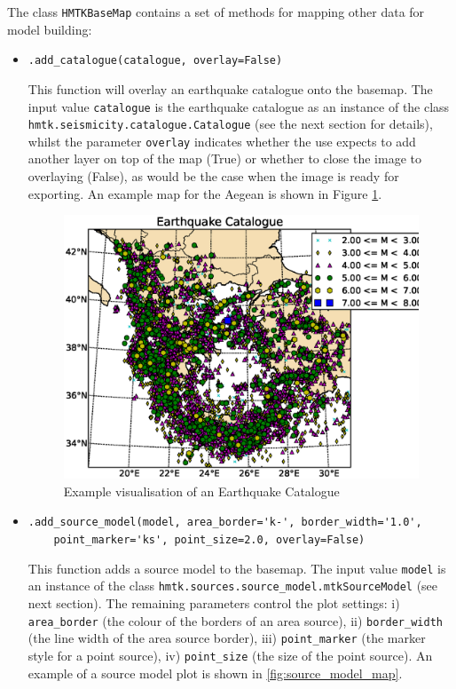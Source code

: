 The class \verb=HMTKBaseMap= contains a set of methods for mapping other data for model building:
\begin{itemize}
\item \verb;.add_catalogue(catalogue, overlay=False);

This function will overlay an earthquake catalogue onto the basemap. The input value \verb=catalogue= is the earthquake catalogue as an instance of the class \\\verb=hmtk.seismicity.catalogue.Catalogue= (see the next section for details), whilst the parameter \verb=overlay= indicates whether the use expects to add another layer on top of the map (True) or whether to close the image to overlaying (False), as would be the case when the image is ready for exporting. An example map for the Aegean is shown in Figure \ref{fig:eqcat_simple}.
   
\begin{figure}[htb]
  \centering
      \includegraphics[trim=20mm 14mm 1mm 1mm, clip, width=\textwidth]{./figures/EQCatalogueSimple.eps}
  \caption{Example visualisation of an Earthquake Catalogue}
  \label{fig:eqcat_simple}
\end{figure}

\item \verb;.add_source_model(model, area_border='k-', border_width='1.0',;\\
    \verb;    point_marker='ks', point_size=2.0, overlay=False);

This function adds a source model to the basemap. The input value \verb=model= is an instance of the class \verb=hmtk.sources.source_model.mtkSourceModel= (see next section). The remaining parameters control the plot settings: i) \verb=area_border= (the colour of the borders of an area source), ii) \verb=border_width= (the line width of the area source border), iii) \verb=point_marker= (the marker style for a point source), iv) \verb=point_size= (the size of the point source). An example of a source model plot is shown in \ref{fig:source_model_map}.
 

\end{itemize}
